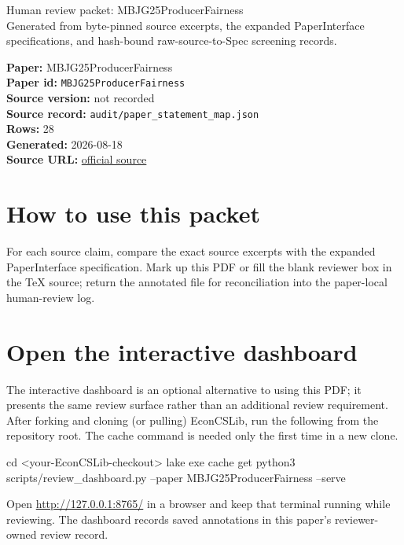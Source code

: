 \documentclass[10pt]{article}
\begin{document}
\fontsize{9}{10}\selectfont

\begin{center}
{\LARGE Human review packet: MBJG25ProducerFairness}\\[0.35em]
\small Generated from byte-pinned source excerpts, the expanded PaperInterface
specifications, and hash-bound raw-source-to-Spec screening records.
\end{center}

\noindent\textbf{Paper:} MBJG25ProducerFairness\\
\textbf{Paper id:} \texttt{MBJG25ProducerFairness}\\
\textbf{Source version:} not recorded\\
\textbf{Source record:} \texttt{audit/paper\_statement\_map.json}\\
\textbf{Rows:} 28\\
\textbf{Generated:} 2026-08-18\\
\textbf{Source URL:} \href{https://doi.org/10.1609/icwsm.v19i1.35854}{official source}

\noindent{}\par



\section*{How to use this packet}
For each source claim, compare the exact source excerpts with the expanded
PaperInterface specification. Mark up this PDF or fill the blank reviewer box in the TeX source;
return the annotated file for reconciliation into the paper-local human-review
log.

\section*{Open the interactive dashboard}
The interactive dashboard is an optional alternative to using this PDF; it
presents the same review surface rather than an additional review requirement.
After forking and cloning (or pulling) EconCSLib, run the following from the
repository root. The cache command is needed only the first time in a new clone.
\begin{ReviewVerbatim}
cd <your-EconCSLib-checkout>
lake exe cache get
python3 scripts/review_dashboard.py --paper MBJG25ProducerFairness --serve
\end{ReviewVerbatim}
Open \url{http://127.0.0.1:8765/} in a browser and keep that terminal running
while reviewing. The dashboard records saved annotations in this paper's
reviewer-owned review record.
\end{document}

